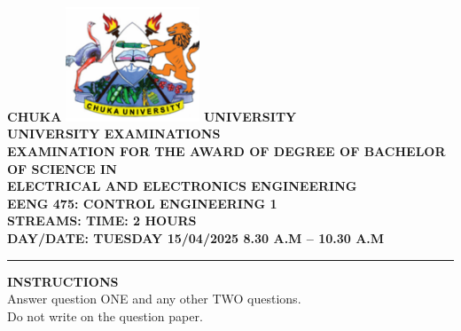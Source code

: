 \documentclass[12pt]{article}
\begin{document}
	
		
	\begin{center}
		\textbf{CHUKA} \hspace{2cm}
		\includegraphics[width=0.3\textwidth]{images/picture1} %
		\hspace{2cm} \textbf{UNIVERSITY} \\
		\vspace{0.3cm}
		\textbf{UNIVERSITY EXAMINATIONS} \\
		\vspace{0.3cm}
		\textbf{EXAMINATION FOR THE AWARD OF DEGREE OF BACHELOR OF SCIENCE IN} \\
		\textbf{ELECTRICAL AND ELECTRONICS ENGINEERING} \\
		\vspace{0.3cm}
		\textbf{EENG 475: CONTROL ENGINEERING 1} \\
		\vspace{0.3cm}
		\textbf{STREAMS: \hspace{5cm} TIME: 2 HOURS} \\
		\vspace{0.3cm}
		\textbf{DAY/DATE: TUESDAY 15/04/2025 \hspace{2cm} 8.30 A.M – 10.30 A.M} \\
		\rule{\textwidth}{0.4pt} %
	\end{center}
	
	\vspace{0.5cm}
	
	\noindent \textbf{INSTRUCTIONS} \\
	Answer question ONE and any other TWO questions.\\
	Do not write on the question paper.
	
	\vspace{0.5cm}
	
\end{document}
